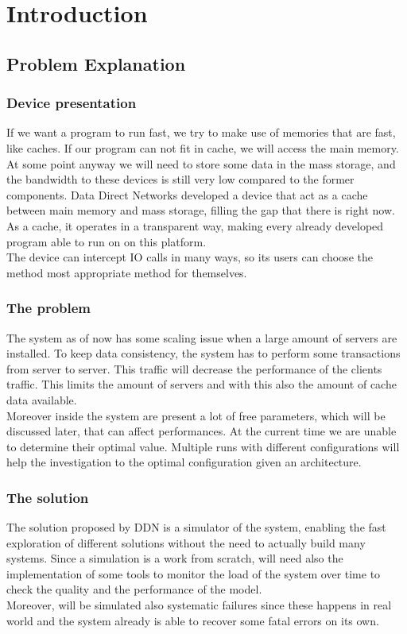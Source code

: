 \section{Introduction}

\subsection{Problem Explanation}
\subsubsection*{Device presentation}
If we want a program to run fast, we try to make use of memories that are fast,
like caches. If our program can not fit in cache, we will access the main memory.
\\
At some point anyway we will need to store some data in the mass storage,
and the bandwidth to these devices is still very low compared to the former
components. 
Data Direct Networks developed a device that act as a cache between main memory
and mass storage, filling the gap that there is right now. \\
As a cache, it operates in a transparent way, making every already
developed program able to run on on this platform. \\
The device can intercept IO calls in many ways, so its users can choose the
method most appropriate method for themselves.

\subsubsection*{The problem}
The system as of now has some scaling issue when a large amount of servers are
installed. To keep data consistency, the system has to perform some transactions
from server to server. This traffic will decrease the performance of the
clients traffic. This limits the amount of servers and with this also the amount
of cache data available. \\
Moreover inside the system are present a lot of free parameters, which will be
discussed later, that can affect performances. At the current time we are
unable to determine their optimal value. Multiple runs with different
configurations will help the investigation to the optimal configuration given an
architecture.

\subsubsection*{The solution}
The solution proposed by DDN is a simulator of the system, enabling the fast
exploration of different solutions without the need to actually build many
systems. Since a simulation is a work from scratch, will need also the
implementation of some tools to monitor the load of the system over time to
check the quality and the performance of the model. \\
Moreover, will be simulated also systematic failures since these happens in real
world and the system already is able to recover some fatal errors on its own.

